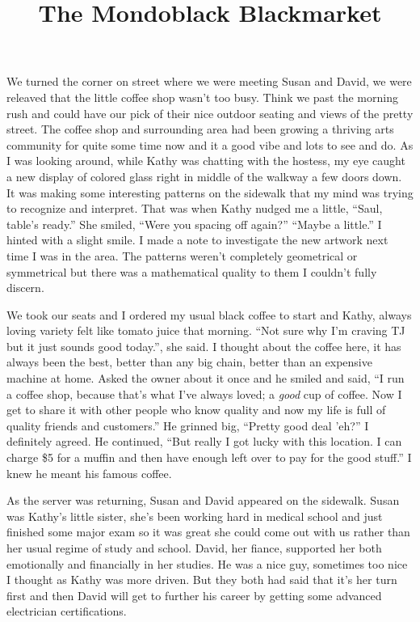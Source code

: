\documentclass[12pt]{article}
\author{}
\date{}
\title{The Mondoblack Blackmarket\vspace{-4ex}}
\begin{document}
\maketitle

We turned the corner on street where we were meeting Susan
and David, we were releaved that the little coffee shop wasn't too
busy. Think we past the morning rush and could have our pick of
their nice outdoor seating and views of the pretty street. The
coffee shop and surrounding area had been growing a thriving arts
community for quite some time now and it a good vibe and lots to
see and do. As I was looking around, while Kathy was chatting with
the hostess, my eye caught a new display of colored glass right in
middle of the walkway a few doors down. It was making some
interesting patterns on the sidewalk that my mind was trying to
recognize and interpret. That was when Kathy nudged me a little,
``Saul, table's ready.'' She smiled, ``Were you spacing off
again?'' ``Maybe a little.'' I hinted with a slight smile. I made
a note to investigate the new artwork next time I was in the area.
The patterns weren't completely geometrical or symmetrical but
there was a mathematical quality to them I couldn't fully discern.

We took our seats and I ordered my usual black coffee to start and
Kathy, always loving variety felt like tomato juice that morning.
``Not sure why I'm craving TJ but it just sounds good today.'',
she said. I thought about the coffee here, it has always been the
best, better than any big chain, better than an expensive machine
at home. Asked the owner about it once and he smiled and said, ``I
run a coffee shop, because that's what I've always loved; a
\emph{good} cup of coffee. Now I get to share it with other people
who know quality and now my life is full of quality friends and
customers.'' He grinned big, ``Pretty good deal 'eh?'' I
definitely agreed. He continued, ``But really I got lucky with
this location. I can charge \$5 for a muffin and then have enough
left over to pay for the good stuff.'' I knew he meant his famous
coffee.

As the server was returning, Susan and David appeared on the
sidewalk. Susan was Kathy's little sister, she's been working hard
in medical school and just finished some major exam so it was
great she could come out with us rather than her usual regime of
study and school. David, her fiance, supported her both
emotionally and financially in her studies. He was a nice guy,
sometimes too nice I thought as Kathy was more driven. But they
both had said that it's her turn first and then David will get to
further his career by getting some advanced electrician
certifications. 
\end{document}
